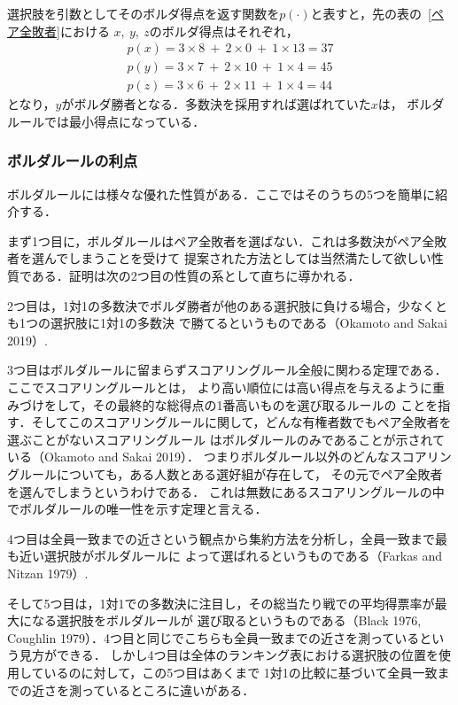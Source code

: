 \documentclass[dvipdfmx]{jsarticle}
\begin{document}
選択肢を引数としてそのボルダ得点を返す関数を$p(\cdot)$と表すと，先の表の~\ref{ペア全敗者}における
$x,\ y,\ z$のボルダ得点はそれぞれ，
\begin{align*}
  p(x) = 3 \times 8 \ + \ 2 \times 0 \ + \ 1 \times 13 = 37 \\
  p(y) = 3 \times 7 \ + \ 2 \times 10 \ + \ 1 \times 4 = 45 \\
  p(z) = 3 \times 6 \ + \ 2 \times 11 \ + \ 1 \times 4 = 44
\end{align*}
となり，$y$がボルダ勝者となる．多数決を採用すれば選ばれていた$x$は，
ボルダルールでは最小得点になっている．

\subsubsection{ボルダルールの利点}\label{ボルダルールの利点}
ボルダルールには様々な優れた性質がある．ここではそのうちの5つを簡単に紹介する．

まず1つ目に，ボルダルールはペア全敗者を選ばない．これは多数決がペア全敗者を選んでしまうことを受けて
提案された方法としては当然満たして欲しい性質である．証明は次の2つ目の性質の系として直ちに導かれる．

2つ目は，1対1の多数決でボルダ勝者が他のある選択肢に負ける場合，少なくとも1つの選択肢に1対1の多数決
で勝てるというものである（Okamoto and Sakai 2019）.

3つ目はボルダルールに留まらずスコアリングルール全般に関わる定理である．ここでスコアリングルールとは，
より高い順位には高い得点を与えるように重みづけをして，その最終的な総得点の1番高いものを選び取るルールの
ことを指す．そしてこのスコアリングルールに関して，どんな有権者数でもペア全敗者を選ぶことがないスコアリングルール
はボルダルールのみであることが示されている（Okamoto and Sakai 2019）．
つまりボルダルール以外のどんなスコアリングルールについても，ある人数とある選好組が存在して，
その元でペア全敗者を選んでしまうというわけである．
これは無数にあるスコアリングルールの中でボルダルールの唯一性を示す定理と言える．

4つ目は全員一致までの近さという観点から集約方法を分析し，全員一致まで最も近い選択肢がボルダルールに
よって選ばれるというものである（Farkas and Nitzan 1979）.

そして5つ目は，1対1での多数決に注目し，その総当たり戦での平均得票率が最大になる選択肢をボルダルールが
選び取るというものである（Black 1976, Coughlin 1979）．4つ目と同じでこちらも全員一致までの近さを測っているという見方ができる．
しかし4つ目は全体のランキング表における選択肢の位置を使用しているのに対して，この5つ目はあくまで
1対1の比較に基づいて全員一致までの近さを測っているところに違いがある．
\end{document}
